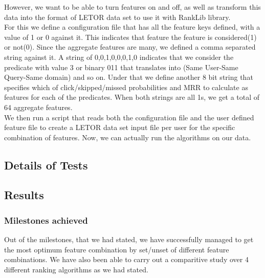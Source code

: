 \documentclass[11pt,letterpaper]{article}
\begin{document}
However, we want to be able to turn features on and off, as well as transform this data into the format of LETOR data set to use it with RankLib library.\\
For this we define a configuration file that has all the feature keys defined, with a value of 1 or 0 against it. This indicates that feature the feature is considered(1) or not(0). Since the aggregate features are many, we defined a comma separated string against it. A string of 0,0,1,0,0,0,1,0 indicates that we consider the predicate with value 3 or binary 011 that translates into (Same User-Same Query-Same domain) and so on. Under that we define another 8 bit string that specifies which of click/skipped/missed probabilities and MRR to calculate as features for each of the predicates. When both strings are all 1s, we get a total of 64 aggregate features. \\ 
We then run a script that reads both the configuration file and the user defined feature file to create a LETOR data set input file per user for the specific combination of features. Now, we can actually run the algorithms on our data.
\subsection{Details of Tests}



\subsection{Results}




\subsubsection*{Milestones achieved}
Out of the milestones, that we had stated, we have successfully managed to get the most optimum feature combination by set/unset of different feature combinations. We have also been able to carry out a comparitive study over 4 different ranking algorithms as we had stated. %
\end{document}
